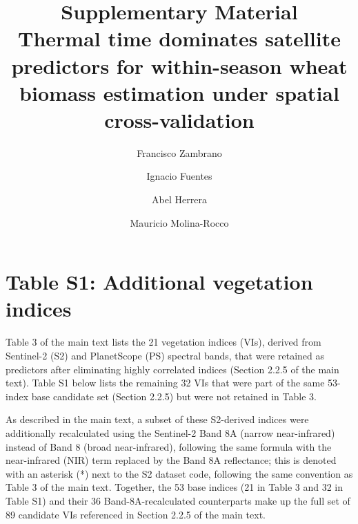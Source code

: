 \documentclass[
  english,
  review,
  number,
  sort,compress,
  authoryear,
  3p]{elsarticle}
\begin{document}
\begin{frontmatter}
\title{Supplementary Material \\\large{Thermal time dominates satellite
predictors for within-season wheat biomass estimation under spatial
cross-validation} }
\author[1]{Francisco Zambrano%
%
}

\author[1]{Ignacio Fuentes%
%
}

\author[2]{Abel Herrera%
%
}

\author[3]{Mauricio Molina-Rocco%
%
}







        





\end{frontmatter}
    

\section{Table S1: Additional vegetation
indices}\label{table-s1-additional-vegetation-indices}

Table 3 of the main text lists the 21 vegetation indices (VIs), derived
from Sentinel-2 (S2) and PlanetScope (PS) spectral bands, that were
retained as predictors after eliminating highly correlated indices
(Section 2.2.5 of the main text). Table S1 below lists the remaining 32
VIs that were part of the same 53-index base candidate set (Section
2.2.5) but were not retained in Table 3.

As described in the main text, a subset of these S2-derived indices were
additionally recalculated using the Sentinel-2 Band 8A (narrow
near-infrared) instead of Band 8 (broad near-infrared), following the
same formula with the near-infrared (NIR) term replaced by the Band 8A
reflectance; this is denoted with an asterisk (*) next to the S2 dataset
code, following the same convention as Table 3 of the main text.
Together, the 53 base indices (21 in Table 3 and 32 in Table S1) and
their 36 Band-8A-recalculated counterparts make up the full set of 89
candidate VIs referenced in Section 2.2.5 of the main text.
\end{document}
